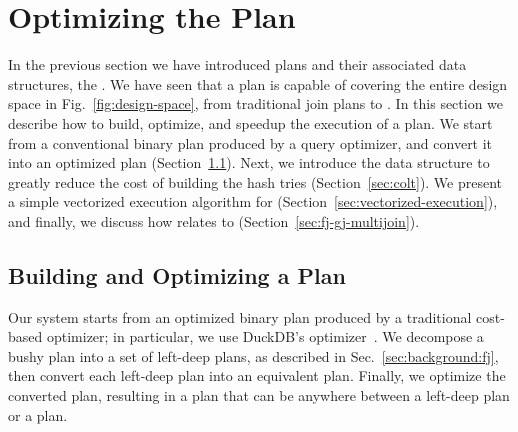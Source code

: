 \section{Optimizing the \FJ Plan}

\label{sec:fj:optimization}

In the previous section we have introduced \FJ plans and their associated
data structures, the \GHTs.  We have seen that a \FJ plan is capable
of covering the entire design space in Fig.~\ref{fig:design-space},
from traditional join plans to \GJ.  In this section we describe how
to build, optimize, and speedup the execution of a \FJ plan.  We start
from a conventional binary plan produced by a query optimizer, and convert
it into an optimized \FJ plan (Section~\ref{sec:bj-to-fj}). Next, we
introduce the \COLT data structure to greatly reduce the cost of
building the hash tries (Section~\ref{sec:colt}).  We present a simple
vectorized execution algorithm for \FJ
(Section~\ref{sec:vectorized-execution}), and finally, we discuss how
\FJ relates to \GJ (Section~\ref{sec:fj-gj-multijoin}).


\subsection{Building and Optimizing a \FJ Plan}\label{sec:bj-to-fj}

Our system starts from an optimized binary plan produced by a
traditional cost-based optimizer; in particular, we use DuckDB's
optimizer~\cite{DBLP:conf/cidr/RaasveldtM20,DBLP:conf/vldb/Raasveldt22}. We
decompose a bushy plan into a set of left-deep plans, as described in
Sec.~\ref{sec:background:fj}, then convert each left-deep plan into an
equivalent \FJ plan.  Finally, we optimize the converted \FJ plan,
resulting in a plan that can be anywhere between a left-deep plan or a
\GJ plan.

